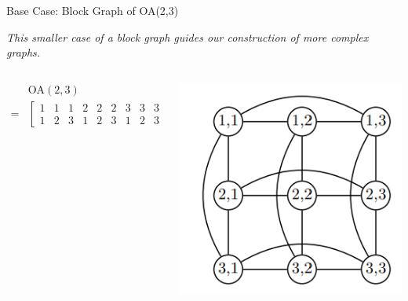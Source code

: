 \documentclass{beamer}
\begin{document}
\begin{frame}{Base Case: Block Graph of OA(2,3)}

\vspace{1em}
\textit{This smaller case of a block graph guides our construction of more complex graphs.}

\vspace{1em}

\begin{columns}
  \begin{column}{0.6\textwidth}
    \begin{align*}
    &\text{OA}(2,3) \\=
    &\begin{bmatrix}
    1 & 1 & 1 & 2 & 2 & 2 & 3 & 3 & 3 \\
    1 & 2 & 3 & 1 & 2 & 3 & 1 & 2 & 3 
    \end{bmatrix}
    \end{align*}
  \end{column}

  \begin{column}{0.4\textwidth}
    \centering
    \includegraphics[width=\textwidth]{slides/r3.png}
  \end{column}
\end{columns}
\end{frame}
\end{document}
